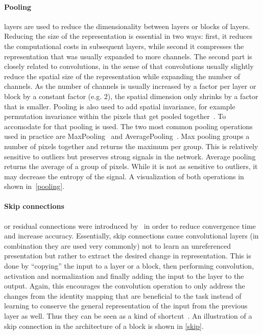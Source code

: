 \paragraph{Pooling} layers are used to reduce the dimensionality between layers or blocks of layers.
Reducing the size of the representation is essential in two ways: first, it reduces the computational costs in subsequent layers, while second it compresses the representation that was usually expanded to more channels.
The second part is closely related to convolutions, in the sense of that convolutions usually slightly reduce the spatial size of the representation while expanding the number of channels.
As the number of channels is usually increased by a factor per layer or block by a constant factor (e.g. $2$), the spatial dimension only shrinks by a factor that is smaller.
Pooling is also used to add spatial invariance, for example permutation invariance within the pixels that get pooled together~\autocite{goodfellow_deep_2016}.
To accomodate for that pooling is used.
The two most common pooling operations used in practice are MaxPooling~\autocite{zhou_computation_1988} and AveragePooling~\autocite{gholamalinezhad_pooling_nodate}.
Max pooling groups a number of pixels together and returns the maximum per group.
This is relatively sensitive to outliers but preserves strong signals in the network.
Average pooling returns the average of a group of pixels.
While it is not as sensitive to outliers, it may decrease the entropy of the signal.
A visualization of both operations in shown in~\ref{pooling}.

\paragraph{Skip connections} or residual connections were introduced by~\autocite{he_deep_2016} in order to reduce convergence time and increase accuracy.
Essentially, skip connections cause convolutional layers (in combination they are used very commonly) not to learn an unreferenced presentation but rather to extract the desired change in representation.
This is done by ``copying'' the input to a layer or a block, then performing convolution, activation and normalization and finally adding the input to the layer to the output.
Again, this encourages the convolution operation to only address the changes from the identity mapping that are beneficial to the task instead of learning to conserve the general representation of the input from the previous layer as well.
Thus they can be seen as a kind of shortcut~\autocite{he_deep_2016}.
An illustration of a skip connection in the architecture of a block is shown in \ref{skip}.

